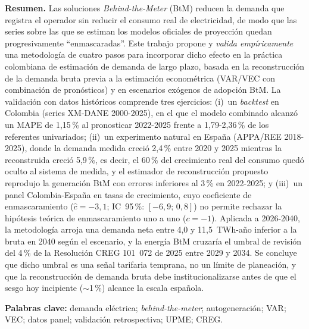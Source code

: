 \documentclass[11pt,letterpaper]{article}
\begin{document}
\noindent\textbf{Resumen.}
Las soluciones \emph{Behind-the-Meter} (BtM) reducen la demanda que registra el
operador sin reducir el consumo real de electricidad, de modo que las series
sobre las que se estiman los modelos oficiales de proyección quedan
progresivamente ``enmascaradas''. Este trabajo propone y \emph{valida
empíricamente} una metodología de cuatro pasos para incorporar dicho efecto en
la práctica colombiana de estimación de demanda de largo plazo, basada en la
reconstrucción de la demanda bruta previa a la estimación econométrica
(VAR/VEC con combinación de pronósticos) y en escenarios exógenos de adopción
BtM. La validación con datos históricos comprende tres ejercicios: (i)~un
\emph{backtest} en Colombia (series XM-DANE 2000-2025), en el que el modelo
combinado alcanzó un MAPE de 1,15\,\% al pronosticar 2022-2025 frente a
1,79-2,36\,\% de los referentes univariados; (ii)~un experimento natural en
España (APPA/REE 2018-2025), donde la demanda medida creció 2,4\,\% entre
2020 y 2025 mientras la reconstruida creció 5,9\,\%, es decir, el 60\,\% del
crecimiento real del consumo quedó oculto al sistema de medida, y el
estimador de reconstrucción propuesto reprodujo la generación BtM con errores
inferiores al 3\,\% en 2022-2025; y (iii)~un panel Colombia-España en tasas
de crecimiento, cuyo coeficiente de enmascaramiento
($\hat{c}=-3{,}1$; IC~95\,\%: $[-6{,}9;\,0{,}8]$) no permite rechazar la
hipótesis teórica de enmascaramiento uno a uno ($c=-1$). Aplicada a
2026-2040, la metodología arroja una demanda neta entre 4,0 y 11,5~TWh-año
inferior a la bruta en 2040 según el escenario, y la energía BtM cruzaría el
umbral de revisión del 4\,\% de la Resolución CREG 101~072 de 2025 entre 2029
y 2034. Se concluye que dicho umbral es una señal tarifaria temprana, no un
límite de planeación, y que la reconstrucción de demanda bruta debe
institucionalizarse antes de que el sesgo hoy incipiente ($\sim$1\,\%) alcance
la escala española.

\smallskip
\noindent\textbf{Palabras clave:} demanda eléctrica; \emph{behind-the-meter};
autogeneración; VAR; VEC; datos panel; validación retrospectiva; UPME; CREG.
\end{document}
